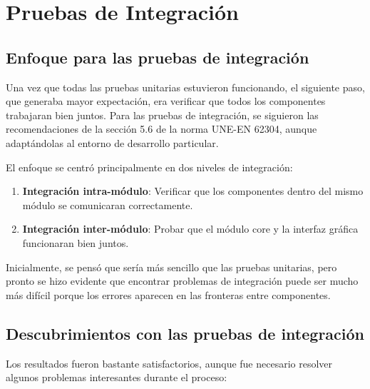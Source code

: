 \newpage

\section{Pruebas de Integración}

\subsection{Enfoque para las pruebas de integración}

Una vez que todas las pruebas unitarias estuvieron funcionando, el siguiente paso, que generaba mayor expectación, era verificar que todos los componentes trabajaran bien juntos. Para las pruebas de integración, se siguieron las recomendaciones de la sección 5.6 de la norma UNE-EN 62304, aunque adaptándolas al entorno de desarrollo particular.

El enfoque se centró principalmente en dos niveles de integración:

\begin{enumerate}
    \item \textbf{Integración intra-módulo}: Verificar que los componentes dentro del mismo módulo se comunicaran correctamente.
    \item \textbf{Integración inter-módulo}: Probar que el módulo core y la interfaz gráfica funcionaran bien juntos.
\end{enumerate}

Inicialmente, se pensó que sería más sencillo que las pruebas unitarias, pero pronto se hizo evidente que encontrar problemas de integración puede ser mucho más difícil porque los errores aparecen en las fronteras entre componentes.

\subsection{Descubrimientos con las pruebas de integración}

Los resultados fueron bastante satisfactorios, aunque fue necesario resolver algunos problemas interesantes durante el proceso:

